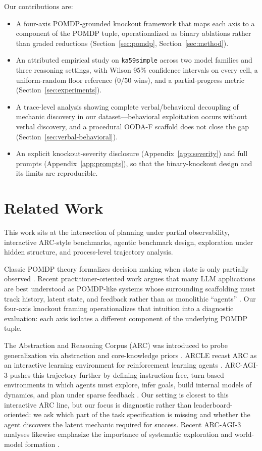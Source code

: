 \documentclass{article}
\begin{document}
Our contributions are:
\begin{itemize}
  \item A four-axis POMDP-grounded knockout framework that maps each axis to a component of the POMDP tuple, operationalized as binary ablations rather than graded reductions (Section~\ref{sec:pomdp}, Section~\ref{sec:method}).
  \item An attributed empirical study on \texttt{ka59simple} across two model families and three reasoning settings, with Wilson 95\% confidence intervals on every cell, a uniform-random floor reference ($0/50$ wins), and a partial-progress metric (Section~\ref{sec:experiments}).
  \item A trace-level analysis showing complete verbal/behavioral decoupling of mechanic discovery in our dataset---behavioral exploitation occurs without verbal discovery, and a procedural OODA-F scaffold does not close the gap (Section~\ref{sec:verbal-behavioral}).
  \item An explicit knockout-severity disclosure (Appendix~\ref{app:severity}) and full prompts (Appendix~\ref{app:prompts}), so that the binary-knockout design and its limits are reproducible.
\end{itemize}

\section{Related Work}
\label{sec:related}
This work sits at the intersection of planning under partial observability, interactive ARC-style benchmarks, agentic benchmark design, exploration under hidden structure, and process-level trajectory analysis.

Classic POMDP theory formalizes decision making when state is only partially observed \citep{kaelbling1998pomdp}. Recent practitioner-oriented work argues that many LLM applications are best understood as POMDP-like systems whose surrounding scaffolding must track history, latent state, and feedback rather than as monolithic ``agents'' \citep{tensorzero2025pomdp}. Our four-axis knockout framing operationalizes that intuition into a diagnostic evaluation: each axis isolates a different component of the underlying POMDP tuple.

The Abstraction and Reasoning Corpus (ARC) was introduced to probe generalization via abstraction and core-knowledge priors \citep{chollet2019measure}. ARCLE recast ARC as an interactive learning environment for reinforcement learning agents \citep{lee2025arcle}. ARC-AGI-3 pushes this trajectory further by defining instruction-free, turn-based environments in which agents must explore, infer goals, build internal models of dynamics, and plan under sparse feedback \citep{arcfoundation2026arcagi3}. Our setting is closest to this interactive ARC line, but our focus is diagnostic rather than leaderboard-oriented: we ask which part of the task specification is missing and whether the agent discovers the latent mechanic required for success. Recent ARC-AGI-3 analyses likewise emphasize the importance of systematic exploration and world-model formation \citep{arcprize2026analysis,rudakov2025grapharc}.
\end{document}
